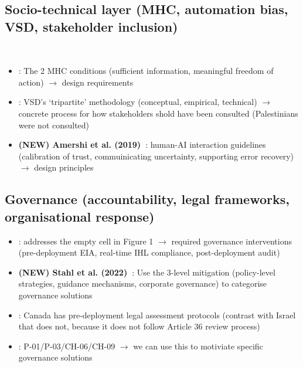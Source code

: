 \subsection{Socio-technical layer (MHC, automation bias, VSD, stakeholder inclusion)}\
\begin{itemize}
	\item \textbf{\citet{mhcof}}: The 2 MHC conditions (sufficient information, meaningful freedom of action) $\rightarrow$ design requirements
	\item \textbf{\citet{parasuraman2010complacency}}: VSD's `tripartite' methodology (conceptual, empirical, technical) $\rightarrow$ concrete process for how stakeholders shold have been consulted (Palestinians were not consulted)
	\item \textbf{(NEW) Amershi et al. (2019)~\citep{amershi2019guidelines}}: human-AI interaction guidelines (calibration of trust, commuinicating uncertainty, supporting error recovery) $\rightarrow$ design principles
\end{itemize}


\subsection{Governance (accountability, legal frameworks, organisational response)}
\begin{itemize}
	\item \textbf{\citet{info12090385}}: addresses the empty cell in Figure 1 $\rightarrow$ required governance interventions (pre-deployment EIA, real-time IHL compliance, post-deployment audit)
	\item \textbf{(NEW) Stahl et al. (2022)~\citep{stahl2022organisational}}: Use the 3-level mitigation (policy-level strategies, guidance mechanisms, corporate governance) to categorise governance solutions
	\item \textbf{\citet{aimag.v40i1.2848}}: Canada has pre-deployment legal assessment protocols (contrast with Israel that does not, because it does not follow Article 36 review process)
	\item \textbf{\citet{khan2021ethicsaisystematicliterature}}: P-01/P-03/CH-06/CH-09 $\rightarrow$ we can use this to motiviate specific governance solutions
\end{itemize}
